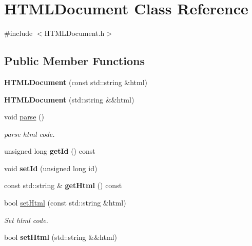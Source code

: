 \hypertarget{classHTMLDocument}{}\section{H\+T\+M\+L\+Document Class Reference}
\label{classHTMLDocument}


{\ttfamily \#include $<$H\+T\+M\+L\+Document.\+h$>$}

\subsection*{Public Member Functions}
\begin{DoxyCompactItemize}
\item 
{\bfseries H\+T\+M\+L\+Document} (const std\+::string \&html)\hypertarget{classHTMLDocument_a98e4e50ff2b4fe3b13cea21e3094e80d}{}\label{classHTMLDocument_a98e4e50ff2b4fe3b13cea21e3094e80d}

\item 
{\bfseries H\+T\+M\+L\+Document} (std\+::string \&\&html)\hypertarget{classHTMLDocument_acc0354fc26aac69b2fd1a04706c1e25f}{}\label{classHTMLDocument_acc0354fc26aac69b2fd1a04706c1e25f}

\item 
void \hyperlink{classHTMLDocument_a20196a45d63965ad7c9860079adbf779}{parse} ()
\begin{DoxyCompactList}\small\item\em parse html code. \end{DoxyCompactList}\item 
unsigned long {\bfseries get\+Id} () const \hypertarget{classHTMLDocument_a28fa57f3d55f2dd1a4f7cbb3fd544200}{}\label{classHTMLDocument_a28fa57f3d55f2dd1a4f7cbb3fd544200}

\item 
void {\bfseries set\+Id} (unsigned long id)\hypertarget{classHTMLDocument_a445aad9a305d71d496e52c935fab720e}{}\label{classHTMLDocument_a445aad9a305d71d496e52c935fab720e}

\item 
const std\+::string \& {\bfseries get\+Html} () const \hypertarget{classHTMLDocument_acff4c5828290b6997d9c29f69bdc5915}{}\label{classHTMLDocument_acff4c5828290b6997d9c29f69bdc5915}

\item 
bool \hyperlink{classHTMLDocument_a26d4250db9a7b0dfdd103c4ad4fb4b99}{set\+Html} (const std\+::string \&html)
\begin{DoxyCompactList}\small\item\em Set html code. \end{DoxyCompactList}\item 
bool {\bfseries set\+Html} (std\+::string \&\&html)\hypertarget{classHTMLDocument_aceba92aefa58d39ba06466199580e693}{}\label{classHTMLDocument_aceba92aefa58d39ba06466199580e693}


\end{DoxyCompactItemize}
